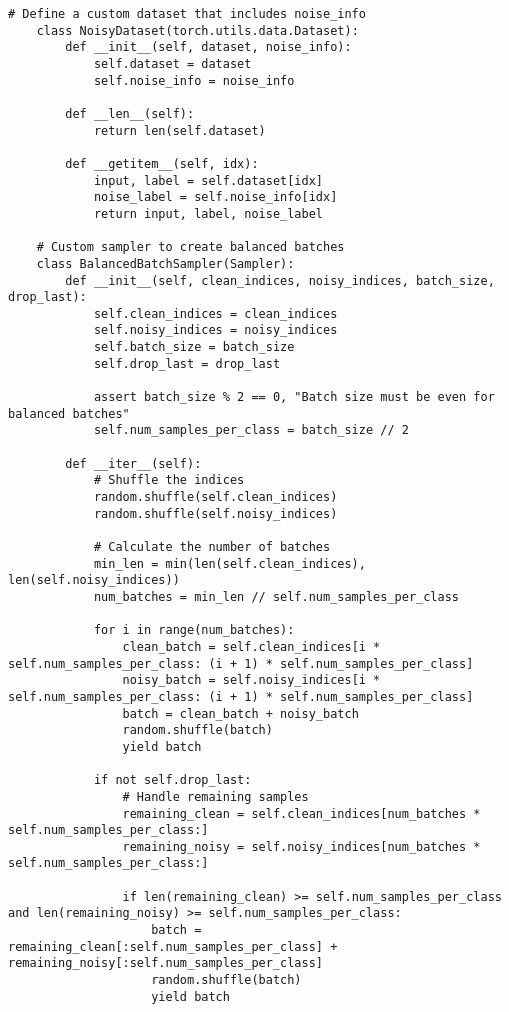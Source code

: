 \begin{lstlisting}[style=pythonstyle, caption={Program Example}]
    # Define a custom dataset that includes noise_info
    class NoisyDataset(torch.utils.data.Dataset):
        def __init__(self, dataset, noise_info):
            self.dataset = dataset
            self.noise_info = noise_info
    
        def __len__(self):
            return len(self.dataset)
    
        def __getitem__(self, idx):
            input, label = self.dataset[idx]
            noise_label = self.noise_info[idx]
            return input, label, noise_label
    
    # Custom sampler to create balanced batches
    class BalancedBatchSampler(Sampler):
        def __init__(self, clean_indices, noisy_indices, batch_size, drop_last):
            self.clean_indices = clean_indices
            self.noisy_indices = noisy_indices
            self.batch_size = batch_size
            self.drop_last = drop_last
    
            assert batch_size % 2 == 0, "Batch size must be even for balanced batches"
            self.num_samples_per_class = batch_size // 2
    
        def __iter__(self):
            # Shuffle the indices
            random.shuffle(self.clean_indices)
            random.shuffle(self.noisy_indices)
    
            # Calculate the number of batches
            min_len = min(len(self.clean_indices), len(self.noisy_indices))
            num_batches = min_len // self.num_samples_per_class
    
            for i in range(num_batches):
                clean_batch = self.clean_indices[i * self.num_samples_per_class: (i + 1) * self.num_samples_per_class]
                noisy_batch = self.noisy_indices[i * self.num_samples_per_class: (i + 1) * self.num_samples_per_class]
                batch = clean_batch + noisy_batch
                random.shuffle(batch)
                yield batch
    
            if not self.drop_last:
                # Handle remaining samples
                remaining_clean = self.clean_indices[num_batches * self.num_samples_per_class:]
                remaining_noisy = self.noisy_indices[num_batches * self.num_samples_per_class:]
    
                if len(remaining_clean) >= self.num_samples_per_class and len(remaining_noisy) >= self.num_samples_per_class:
                    batch = remaining_clean[:self.num_samples_per_class] + remaining_noisy[:self.num_samples_per_class]
                    random.shuffle(batch)
                    yield batch
    

\end{lstlisting}
